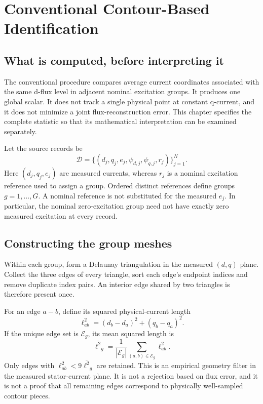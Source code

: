 \chapter{Conventional Contour-Based Identification}\label{ch:contour}

\section{What is computed, before interpreting it}
The conventional procedure compares average current coordinates associated with the same d-flux level in adjacent nominal excitation groups. It produces one global scalar. It does not track a single physical point at constant q-current, and it does not minimize a joint flux-reconstruction error. This chapter specifies the complete statistic so that its mathematical interpretation can be examined separately.

Let the source records be
\begin{equation}
\mathcal D=\{(d_j,q_j,e_j,\psi_{d,j},\psi_{q,j},r_j)\}_{j=1}^{N}.
\end{equation}
Here $(d_j,q_j,e_j)$ are measured currents, whereas $r_j$ is a nominal excitation reference used to assign a group. Ordered distinct references define groups $g=1,\ldots,G$. A nominal reference is not substituted for the measured $e_j$. In particular, the nominal zero-excitation group need not have exactly zero measured excitation at every record.

\section{Constructing the group meshes}
Within each group, form a Delaunay triangulation in the measured $(d,q)$ plane. Collect the three edges of every triangle, sort each edge's endpoint indices and remove duplicate index pairs. An interior edge shared by two triangles is therefore present once.

For an edge $a\!-\!b$, define its squared physical-current length
\begin{equation}
\ell_{ab}^2=(d_b-d_a)^2+(q_b-q_a)^2.
\end{equation}
If the unique edge set is $\mathcal E_g$, its mean squared length is
\begin{equation}
\overline{\ell^2}_g=\frac{1}{|\mathcal E_g|}
\sum_{(a,b)\in\mathcal E_g}\ell_{ab}^2.
\end{equation}
Only edges with $\ell_{ab}^2<9\overline{\ell^2}_g$ are retained. This is an empirical geometry filter in the measured stator-current plane. It is not a rejection based on flux error, and it is not a proof that all remaining edges correspond to physically well-sampled contour pieces.

